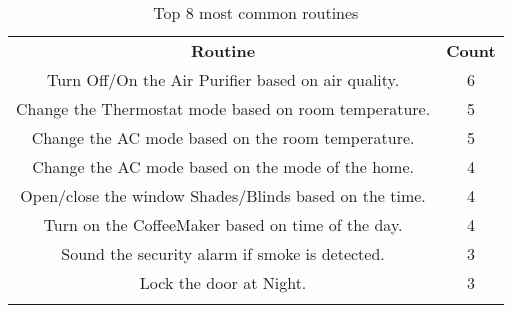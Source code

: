 \begin{table}[t]
\centering
\scriptsize
\caption{{\small Top 8 most common routines}}
\label{tbl:top-8-routines}
\begin{tabular}{c|c}
\Xhline{2\arrayrulewidth}
{\bf Routine}& {\bf Count}\\
\Xhline{2\arrayrulewidth}
 Turn Off/On the Air Purifier based on air quality. & 6 \\
 Change the Thermostat mode based on room temperature. & 5 \\
 Change the AC mode based on the room temperature. & 5 \\
 Change the AC mode based on the mode of the home. & 4 \\
 Open/close the window Shades/Blinds based on the time. & 4 \\
 Turn on the CoffeeMaker based on time of the day. & 4 \\
 Sound the security alarm if smoke is detected. & 3 \\
 Lock the door at Night. & 3 \\
\Xhline{2\arrayrulewidth}
\Xhline{2\arrayrulewidth}
\end{tabular}
\end{table}
